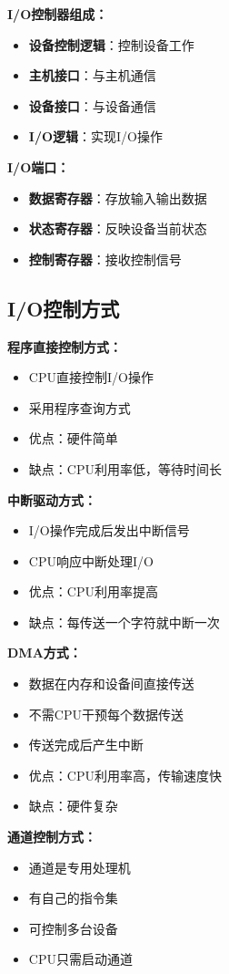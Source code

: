 \documentclass[lang=cn,newtx,10pt,scheme=chinese]{../../elegantbook}
\begin{document}
\textbf{I/O控制器组成：}
\begin{itemize}
  \item \textbf{设备控制逻辑}：控制设备工作
  \item \textbf{主机接口}：与主机通信
  \item \textbf{设备接口}：与设备通信
  \item \textbf{I/O逻辑}：实现I/O操作
\end{itemize}

\textbf{I/O端口：}
\begin{itemize}
  \item \textbf{数据寄存器}：存放输入输出数据
  \item \textbf{状态寄存器}：反映设备当前状态
  \item \textbf{控制寄存器}：接收控制信号
\end{itemize}

\subsection{I/O控制方式}

\textbf{程序直接控制方式：}
\begin{itemize}
  \item CPU直接控制I/O操作
  \item 采用程序查询方式
  \item 优点：硬件简单
  \item 缺点：CPU利用率低，等待时间长
\end{itemize}

\textbf{中断驱动方式：}
\begin{itemize}
  \item I/O操作完成后发出中断信号
  \item CPU响应中断处理I/O
  \item 优点：CPU利用率提高
  \item 缺点：每传送一个字符就中断一次
\end{itemize}

\textbf{DMA方式：}
\begin{itemize}
  \item 数据在内存和设备间直接传送
  \item 不需CPU干预每个数据传送
  \item 传送完成后产生中断
  \item 优点：CPU利用率高，传输速度快
  \item 缺点：硬件复杂
\end{itemize}

\textbf{通道控制方式：}
\begin{itemize}
  \item 通道是专用处理机
  \item 有自己的指令集
  \item 可控制多台设备
  \item CPU只需启动通道
\end{itemize}
\end{document}
